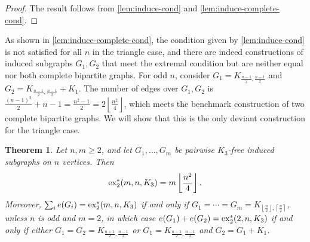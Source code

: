 \documentclass[12pt]{report}
\newtheorem{theorem}{Theorem}[chapter]
\newcommand*{\dex}{\textnormal{ex}_2}
\begin{document}
\begin{proof}
  The result follows from \cref{lem:induce-cond} and \cref{lem:induce-complete-cond}.
\end{proof}

As shown in \cref{lem:induce-complete-cond}, the condition given by \cref{lem:induce-cond} is not satisfied for all $n$ in the triangle case, and there are indeed constructions of induced subgraphs $G_1, G_2$ that meet the extremal condition but are neither equal nor both complete bipartite graphs. For odd $n$, consider $G_1 = K_{\frac{n - 1}{2}, \frac{n - 1}{2}}$ and $G_2 = K_{\frac{n - 1}{2}, \frac{n - 1}{2}} + K_1$. The number of edges over $G_1, G_2$ is $\frac{(n - 1)^2}{2} + n - 1 = \frac{n^2 - 1}{2} = 2\left\lfloor \frac{n^2}{4}\right\rfloor$, which meets the benchmark construction of two complete bipartite graphs. We will show that this is the only deviant construction for the triangle case.

\begin{theorem}\label{thm:induce-triangle}
  Let $n, m \geq 2$, and let $G_1, \ldots, G_m$ be pairwise $K_3$-free induced subgraphs on $n$ vertices. Then
  \[
    \dex^*(m, n, K_3) = m \left\lfloor \frac{n^2}{4} \right\rfloor.
  \]
  Moreover, $\sum_i e(G_i) = \dex^*(m, n, K_3)$ if and only if $G_1 = \cdots = G_m = K_{\left\lfloor\frac{n}{2}\right\rfloor, \left\lceil\frac{n}{2}\right\rceil}$, unless $n$ is odd and $m = 2$, in which case $e(G_1) + e(G_2) = \dex^*(2, n, K_3)$ if and only if either $G_1 = G_2 = K_{\frac{n + 1}{2}, \frac{n - 1}{2}}$ or $G_{1} = K_{\frac{n - 1}{2}, \frac{n - 1}{2}}$ and $G_{2} = G_1 + K_1$.
\end{theorem}
\end{document}
